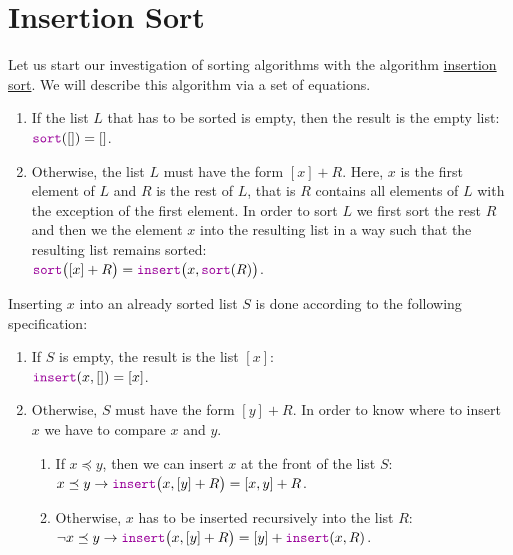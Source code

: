 \section{Insertion Sort \label{sec:insertionSort}}
Let us start our investigation of sorting algorithms with the algorithm
\href{http://en.wikipedia.org/wiki/Insertion_sort}{insertion sort}.
We will describe this algorithm via a set of equations.
\begin{enumerate}
\item If the list $L$ that has to be sorted is empty, then the result is the empty list: 
      \\[0.2cm]
      \hspace*{1.3cm}
      $\mytt{sort}([]) = []$.
\item Otherwise, the list $L$ must have the form $[x] + R$. Here, $x$ is the first element of $L$
      and $R$ is the rest of $L$, that is $R$ contains all elements of $L$ with the exception of the first
      element.  In order to sort 
      $L$ we first sort the rest $R$ and then we  the element $x$ into the resulting list in a
      way such that the resulting list remains sorted:
      \\[0.2cm]
      \hspace*{1.3cm} $\mytt{sort}\bigl([x] + R\bigr) = \mytt{insert}\bigl(x, \mytt{sort}(R)\bigr)$.
\end{enumerate}
Inserting $x$ into an already sorted list $S$ is done according to the following specification:
\begin{enumerate}
\item If $S$ is empty, the result is the list $[x]$: \\[0.2cm]
      \hspace*{1.3cm}
      $\mytt{insert}(x,[]) = [x]$.
\item Otherwise, $S$ must have the form $[y] + R$.  In order to know where to insert $x$ we have to
      compare $x$ and $y$.
      \begin{enumerate}
      \item If $x \preceq y$, then we can insert $x$ at the front of the list $S$: \\[0.2cm]
            \hspace*{1.3cm}
            $x \preceq y \rightarrow \mytt{insert}\bigl(x, [y] + R\bigr) = [x,y] + R$. 
      \item Otherwise, $x$ has to be inserted recursively into the list $R$: \\[0.2cm]
            \hspace*{1.3cm}
            $\neg x \preceq y \rightarrow \mytt{insert}\bigl(x, [y] + R\bigr) = [y] + \mytt{insert}(x,R)$. 
      \end{enumerate}
\end{enumerate}

